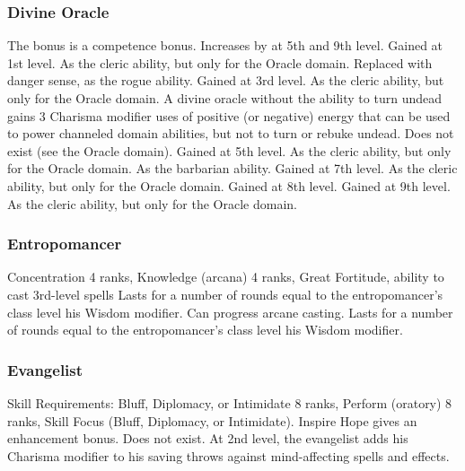 \subsubsection{Divine Oracle}
 The bonus is a competence bonus. Increases by  at 5th and 9th level.
 Gained at 1st level. As the cleric ability, but only for the Oracle domain.
 Replaced with danger sense, as the rogue ability.
 Gained at 3rd level. As the cleric ability, but only for the Oracle domain. A divine oracle without the ability to turn undead gains 3 \add Charisma modifier uses of positive (or negative) energy that can be used to power channeled domain abilities, but not to turn or rebuke undead.
 Does not exist (see the Oracle domain).
 Gained at 5th level. As the cleric ability, but only for the Oracle domain.
 As the barbarian ability.
 Gained at 7th level. As the cleric ability, but only for the Oracle domain.
 Gained at 8th level.
 Gained at 9th level. As the cleric ability, but only for the Oracle domain.
\subsubsection{Entropomancer}
 Concentration 4 ranks, Knowledge (arcana) 4 ranks, Great Fortitude, ability to cast 3rd-level spells
 Lasts for a number of rounds equal to the entropomancer's class level \add his Wisdom modifier.
 Can progress arcane casting.
 Lasts for a number of rounds equal to the entropomancer's class level \add his Wisdom modifier.
\subsubsection{Evangelist}
 Skill Requirements: Bluff, Diplomacy, or Intimidate 8 ranks, Perform (oratory) 8 ranks, Skill Focus (Bluff, Diplomacy, or Intimidate).
 Inspire Hope gives an enhancement bonus.
 Does not exist.
 At 2nd level, the evangelist adds his Charisma modifier to his saving throws against mind-affecting spells and effects.
